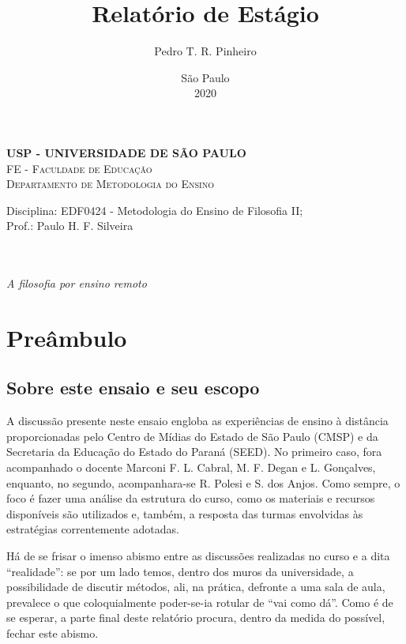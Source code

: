 \documentclass[12pt,a4paper]{article}
\author{Pedro T. R. Pinheiro}
\date{São Paulo\\2020}
\title{Relatório de Estágio}
\newcommand{\subtitulo}{A filosofia por ensino remoto}
\newcommand{\disciplina}{EDF0424 - Metodologia do Ensino de Filosofia II}
\newcommand{\departamento}{Departamento de Metodologia do Ensino}
\newcommand{\unidade}{FE - Faculdade de Educação}
\newcommand{\prof}{Paulo H. F. Silveira}
\begin{document}
	\begin{center}
				\textbf{
				\LARGE USP - UNIVERSIDADE DE SÃO PAULO \\
			}
			\Large \textsc{\unidade} \\
			\large \textsc{\departamento}\\
			\vspace*{1cm}
				
			Disciplina: \disciplina; \\Prof.: \prof
			\vfill
			\begin{center}
				{\Large \textsc{\theauthor}} \\ 
				\vspace{1cm}
				\LARGE\textbf{\thetitle} \\
				\Large\emph{\subtitulo}
			\end{center}
			\vfill
			\large\thedate
			\vspace*{1cm}
			\thispagestyle{empty}			
	\end{center}

	\newpage

	\setlength{\parskip}{0.5cm}
	\setlength{\parindent}{1.1cm}
	\onehalfspacing
	
	\section{Preâmbulo}

	\subsection{Sobre este ensaio e seu escopo}

	A discussão presente neste ensaio engloba as experiências de ensino 
	à distância proporcionadas pelo Centro de Mídias do Estado de 
	São Paulo (CMSP) e da Secretaria da Educação do Estado do Paraná 
	(SEED). No primeiro caso, fora acompanhado o docente Marconi F. L. 
	Cabral, M. F. Degan e L. Gonçalves, enquanto, no segundo, 
	acompanhara-se 	R. Polesi e S. dos Anjos. Como sempre, o foco é fazer 
	uma análise 	da estrutura do curso, como os materiais e recursos 
	disponíveis são utilizados e, também, a resposta das turmas envolvidas 
	às estratégias 	correntemente adotadas. 
	
	Há de se frisar o imenso abismo entre as discussões realizadas no curso 
	e a dita ``realidade'': se por um lado temos, dentro dos muros da 
	universidade, a possibilidade de discutir métodos, ali, na prática, 
	defronte a uma sala de aula, prevalece o que coloquialmente poder-se-ia 
	rotular de ``vai como dá''. Como é de se esperar, a parte final deste 
	relatório procura, dentro da medida do possível, fechar este abismo. 
	
\end{document}
